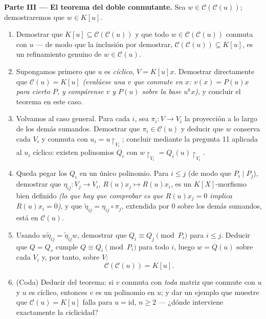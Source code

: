 \begin{problem}
\medskip
\noindent\textbf{Parte III --- El teorema del doble conmutante.} Sea
$w \in \mathcal C(\mathcal C(u))$; demostraremos que $w \in K[u]$.
\begin{enumerate}[resume]
  \item Demostrar que $K[u] \subseteq \mathcal C(\mathcal C(u))$ y que
  todo $w \in \mathcal C(\mathcal C(u))$ conmuta con $u$ --- de modo que
  la inclusión por demostrar,
  $\mathcal C(\mathcal C(u)) \subseteq K[u]$, es un refinamiento genuino
  de $w \in \mathcal C(u)$. \item Supongamos primero que $u$ es
  \emph{cíclico}, $V = K[u]x$. Demostrar directamente que
  $\mathcal C(u) = K[u]$ \emph{(evalúese una $v$ que conmute en $x$:
  $v(x) = P(u)x$ para cierto $P$, y compárense $v$ y $P(u)$ sobre la
  base $u^k x$)}, y concluir el teorema en este caso. \item Volvamos al
  caso general. Para cada $i$, sea $\pi_i\colon
        V \to V_i$ la proyección a lo largo de los demás sumandos.
  Demostrar que $\pi_i \in \mathcal C(u)$ y deducir que $w$ conserva
  cada $V_i$ y conmuta con $u_i =
        u\restriction_{V_i}$; concluir mediante la pregunta 11 aplicada
  al $u_i$ cíclico: existen polinomios $Q_i$ con
        $w\restriction_{V_i} = Q_i(u)\restriction_{V_i}$.
  \item Queda pegar los $Q_i$ en un único polinomio. Para $i
        \leq j$ (de modo que $P_i \mid P_j$), demostrar que
  $\eta_{ij} \colon
        V_j \to V_i$, $R(u)x_j \mapsto R(u)x_i$, es un $K[X]$-morfismo
  bien definido \emph{(lo que hay que comprobar es que $R(u)x_j = 0$
  implica $R(u)x_i = 0$)}, y que
  $\tilde\eta_{ij} = \eta_{ij}\circ\pi_j$, extendida por $0$ sobre los
  demás sumandos, está en $\mathcal C(u)$. \item Usando
  $w\tilde\eta_{ij} = \tilde\eta_{ij}w$, demostrar que $Q_i
        \equiv Q_j \pmod{P_i}$ para $i \leq j$. Deducir que $Q =
        Q_s$ cumple $Q \equiv Q_i \pmod {P_i}$ para todo $i$, luego
  $w = Q(u)$ sobre cada $V_i$ y, por tanto, sobre $V$:
        \[
        \boxed{\ \mathcal C(\mathcal C(u)) = K[u].\ }
        \]
  \item (Coda) Deducir del teorema: si $v$ conmuta con \emph{toda}
  matriz que conmute con $u$ y $u$ es cíclico, entonces $v$ es un
  polinomio en $u$; y dar un ejemplo que muestre que
  $\mathcal C(u) = K[u]$ falla para $u =
        \mathrm{id}$, $n \geq 2$ --- ¿dónde interviene exactamente la
  ciclicidad?
\end{enumerate}


\end{problem}
